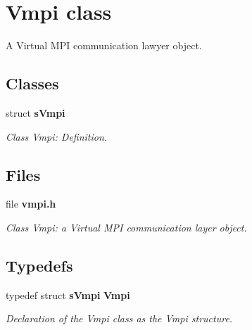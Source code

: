 \section{Vmpi class}
\label{a00026}


A Virtual MPI communication lawyer object.  


\subsection*{Classes}
\begin{DoxyCompactItemize}
\item 
struct {\bf sVmpi}
\begin{DoxyCompactList}\small\item\em Class Vmpi: Definition. \item\end{DoxyCompactList}\end{DoxyCompactItemize}
\subsection*{Files}
\begin{DoxyCompactItemize}
\item 
file {\bf vmpi.h}


\begin{DoxyCompactList}\small\item\em Class Vmpi: a Virtual MPI communication layer object. \item\end{DoxyCompactList}

\end{DoxyCompactItemize}
\subsection*{Typedefs}
\begin{DoxyCompactItemize}
\item 
typedef struct {\bf sVmpi} {\bf Vmpi}
\begin{DoxyCompactList}\small\item\em Declaration of the Vmpi class as the Vmpi structure. \item\end{DoxyCompactList}\end{DoxyCompactItemize}
